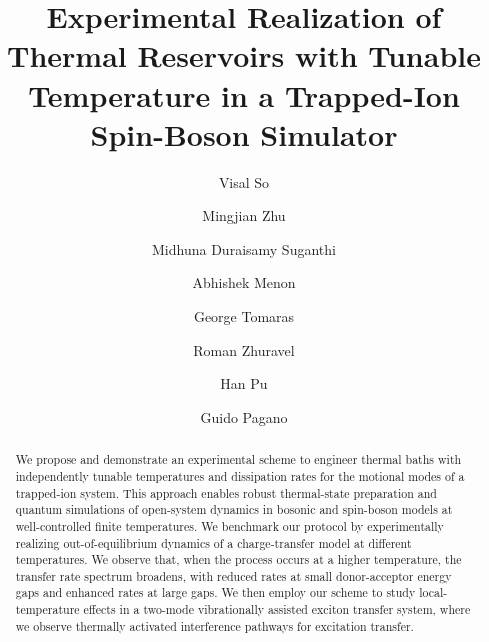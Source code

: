 \documentclass[%
reprint,
superscriptaddress,
amsmath,amssymb,
aps,
prl,
floatfix,
]{revtex4-2}
\begin{document}
\raggedbottom

\title{Experimental Realization of Thermal Reservoirs with Tunable Temperature in a Trapped-Ion Spin-Boson Simulator}

\author{Visal So}
\author{Mingjian Zhu}
\author{Midhuna Duraisamy Suganthi}
\author{Abhishek Menon}
\author{George Tomaras}
\author{Roman Zhuravel}
\author{Han Pu}
\author{Guido Pagano}

\begin{abstract}
    We propose and demonstrate an experimental scheme to engineer thermal baths with independently tunable temperatures and dissipation rates for the motional modes of a trapped-ion system. This approach enables robust thermal-state preparation and quantum simulations of open-system dynamics in bosonic and spin-boson models at well-controlled finite temperatures. We benchmark our protocol by experimentally realizing out-of-equilibrium dynamics of a charge-transfer model at different temperatures. We observe that, when the process occurs at a higher temperature, the transfer rate spectrum broadens, with reduced rates at small donor-acceptor energy gaps and enhanced rates at large gaps. We then employ our scheme to study local-temperature effects in a two-mode vibrationally assisted exciton transfer system, where we observe thermally activated interference pathways for excitation transfer.
\end{abstract}
\end{document}
